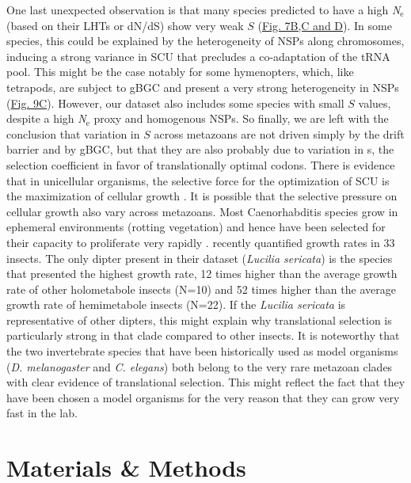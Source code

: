 One last unexpected observation is that many species predicted to have a high \textit{N}$_{\text{e}}$ (based on their LHTs or dN/dS) show very weak $S$ (\hyperref[fig:CU7]{Fig. 7B,C and D}). In some species, this could be explained by the heterogeneity of NSPs along chromosomes, inducing a strong variance in SCU that precludes a co-adaptation of the tRNA pool. This might be the case notably for some hymenopters, which, like tetrapods, are subject to gBGC \citep{wallberg_extreme_2015} and present a very strong heterogeneity in NSPs (\hyperref[fig:CU9]{Fig. 9C}). However, our dataset also includes some species with small $S$ values, despite a high \textit{N}$_{\text{e}}$ proxy and homogenous NSPs. So finally, we are left with the conclusion that variation in $S$ across metazoans are not driven simply by the drift barrier and by gBGC, but that they are also probably due to variation in s, the selection coefficient in favor of translationally optimal codons. There is evidence that in unicellular organisms, the selective force for the optimization of SCU is the maximization of cellular growth \citep{rocha_codon_2004, sharp_variation_2005}. It is possible that the selective pressure on cellular growth also vary across metazoans. Most Caenorhabditis species grow in ephemeral environments (rotting vegetation) and hence have been selected for their capacity to proliferate very rapidly \citep{cutter_caenorhabditis_2015}. \citet{manthey_rapid_2024} recently quantified growth rates in 33 insects. The only dipter present in their dataset (\textit{Lucilia sericata}) is the species that presented the highest growth rate, 12 times higher than the average growth rate of other holometabole insects (N=10) and 52 times higher than the average growth rate of hemimetabole insects (N=22). If the \textit{Lucilia sericata} is representative of other dipters, this might explain why translational selection is particularly strong in that clade compared to other insects. It is noteworthy that the two invertebrate species that have been historically used as model organisms (\textit{D. melanogaster} and \textit{C. elegans}) both belong to the very rare metazoan clades with clear evidence of translational selection. This might reflect the fact that they have been chosen a model organisms for the very reason that they can grow very fast in the lab.





\section{Materials \& Methods}
\label{sec:MaterialsMethodsCU}


